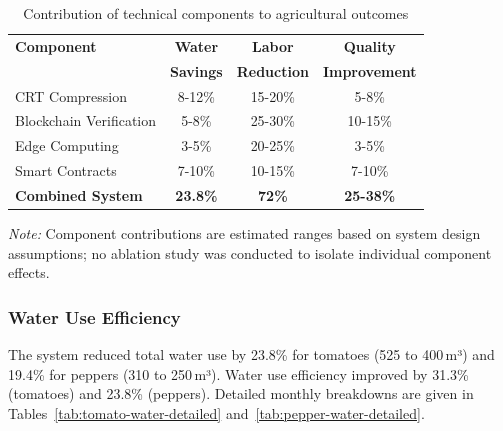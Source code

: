 \documentclass[pdflatex,sn-mathphys-num]{sn-jnl}
\theoremstyle{thmstyleone}
\theoremstyle{thmstyletwo}
\theoremstyle{thmstylethree}
\begin{document}
\begin{table}[htbp]
\centering
\caption{Contribution of technical components to agricultural outcomes}
\label{tab:integration_benefits}
\footnotesize
\begin{tabular}{@{}lccc@{}}
\toprule
\textbf{Component} & \textbf{Water} & \textbf{Labor} & \textbf{Quality} \\
 & \textbf{Savings} & \textbf{Reduction} & \textbf{Improvement} \\
\midrule
CRT Compression & 8-12\% & 15-20\% & 5-8\% \\
Blockchain Verification & 5-8\% & 25-30\% & 10-15\% \\
Edge Computing & 3-5\% & 20-25\% & 3-5\% \\
Smart Contracts & 7-10\% & 10-15\% & 7-10\% \\
\textbf{Combined System} & \textbf{23.8\%} & \textbf{72\%} & \textbf{25-38\%} \\
\bottomrule
\end{tabular}
{\footnotesize \textit{Note:} Component contributions are estimated ranges based on system design assumptions; no ablation study was conducted to isolate individual component effects.}
\end{table}

\subsubsection{Water Use Efficiency}
The system reduced total water use by 23.8\% for tomatoes (525 to 400\,m³) and 19.4\% for peppers (310 to 250\,m³). Water use efficiency improved by 31.3\% (tomatoes) and 23.8\% (peppers). Detailed monthly breakdowns are given in Tables~\ref{tab:tomato-water-detailed} and~\ref{tab:pepper-water-detailed}.
\end{document}
